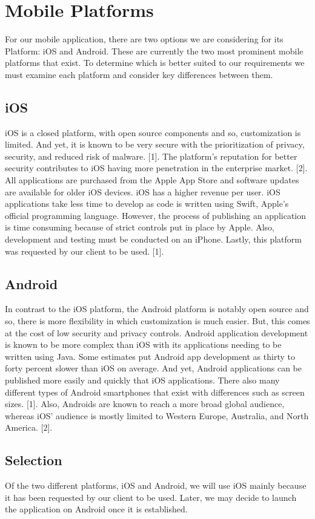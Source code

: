 \documentclass[onecolumn, draftclsnofoot,10pt, journal, letterpaper]{IEEEtran}
\begin{document}
\section{Mobile Platforms}
For our mobile application, there are two options we are considering for its Platform: iOS and Android. These are currently the two most prominent mobile platforms that exist. To determine which is better suited to our requirements we must examine each platform and consider key differences between them.
\subsection{iOS}
iOS is a closed platform, with open source components and so, customization is limited. And yet, it is known to be very secure with the prioritization of privacy, security, and reduced risk of malware. [1]. The platform's reputation for better security contributes to iOS having more penetration in the enterprise market. [2]. All applications are purchased from the Apple App Store and software updates are available for older iOS devices. iOS has a higher revenue per user. iOS applications take less time to develop as code is written using Swift, Apple's official programming language. However, the process of publishing an application is time consuming because of strict controls put in place by Apple. Also, development and testing must be conducted on an iPhone. Lastly, this platform was requested by our client to be used. [1].
\subsection{Android}
In contrast to the iOS platform, the Android platform is notably open source and so, there is more flexibility in which customization is much easier. But, this comes at the cost of low security and privacy controls. Android application development is known to be more complex than iOS with its applications needing to be written using Java. Some estimates put Android app development as thirty to forty percent slower than iOS on average. And yet, Android applications can be published more easily and quickly that iOS applications. There also many different types of Android smartphones that exist with differences such as screen sizes. [1]. Also, Androids are known to reach a more broad global audience, whereas iOS' audience is mostly limited to Western Europe, Australia, and North America. [2].
\subsection{Selection}
Of the two different platforms, iOS and Android, we will use iOS mainly because it has been requested by our client to be used. Later, we may decide to launch the application on Android once it is established.
\end{document}

